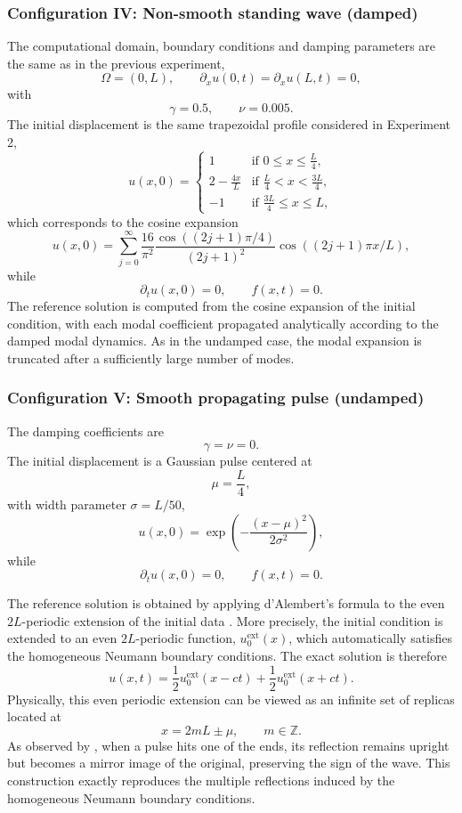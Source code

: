 \documentclass{Configuration_Files/PoliMi3i_thesis}
\begin{document}
\subsubsection{Configuration IV: Non-smooth standing wave (damped)}
The computational domain, boundary conditions and damping parameters are the same as in the previous experiment,
\[
\Omega=(0,L),\qquad
\partial_xu(0,t)=\partial_xu(L,t)=0,
\]
with
\[
\gamma=0.5,
\qquad
\nu=0.005.
\]
The initial displacement is the same trapezoidal profile considered in Experiment 2,
\[
u(x,0) = 
\begin{cases}
1 & \text{if } 0 \le x \le \frac{L}{4}, \\[4pt]
2 - \frac{4x}{L} & \text{if } \frac{L}{4} < x < \frac{3L}{4}, \\[4pt]
-1 & \text{if } \frac{3L}{4} \le x \le L,
\end{cases}
\]
which corresponds to the cosine expansion
\[
u(x,0)
=
\sum_{j=0}^{\infty}
\frac{16}{\pi^2} \frac{\cos\left((2j+1)\pi/4\right)}{(2j+1)^2}
\cos\left((2j+1)\pi x/L\right),
\]
while
\[
\partial_tu(x,0)=0,
\qquad
f(x,t)=0.
\]
The reference solution is computed from the cosine expansion of the initial condition, with each modal coefficient propagated analytically according to the damped modal dynamics. As in the undamped case, the modal expansion is truncated after a sufficiently large number of modes.

\subsubsection{Configuration V: Smooth propagating pulse (undamped)}
The damping coefficients are
\[
\gamma=\nu=0.
\]
The initial displacement is a Gaussian pulse centered at
\[
\mu=\frac{L}{4},
\]
with width parameter $\sigma=L/50$,
\[
u(x,0)
=
\exp\!\left(
-\frac{(x-\mu)^2}{2\sigma^2}
\right),
\]
while
\[
\partial_tu(x,0)=0,
\qquad
f(x,t)=0.
\]

The reference solution is obtained by applying d'Alembert's formula to the even $2L$-periodic extension of the initial data \cite[Sec.~4.2]{olver_introduction_2014}. More precisely, the initial condition is extended to an even $2L$-periodic function, $u_0^{\mathrm{ext}}(x)$, which automatically satisfies the homogeneous Neumann boundary conditions. The exact solution is therefore
\[
u(x,t)
=
\frac12
u_0^{\mathrm{ext}}(x-ct)
+
\frac12
u_0^{\mathrm{ext}}(x+ct).
\]
Physically, this even periodic extension can be viewed as an infinite set of replicas located at
\[
x=2mL\pm\mu,
\qquad
m\in\mathbb Z.
\]
As observed by \citet[Sec.~4.2]{olver_introduction_2014}, when a pulse hits one of the ends, its reflection remains upright but becomes a mirror image of the original, preserving the sign of the wave. This construction exactly reproduces the multiple reflections induced by the homogeneous Neumann boundary conditions. 
\end{document}
